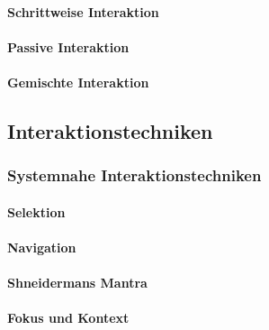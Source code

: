                 \paragraph{Schrittweise Interaktion} %

                \paragraph{Passive Interaktion} %

                \paragraph{Gemischte Interaktion} %

        \subsection{Interaktionstechniken} %

            \subsubsection{Systemnahe Interaktionstechniken} %

                \paragraph{Selektion} %

                \paragraph{Navigation} %

                \paragraph{Shneidermans Mantra} %

                \paragraph{Fokus und Kontext} %

